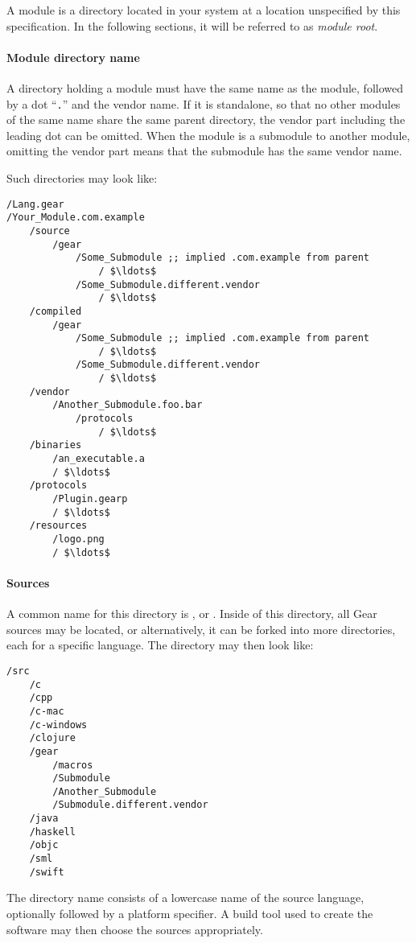 A module is a directory located in your system at a location unspecified by this specification. In the following sections, it will be referred to as {\em module root}. 

\paragraph{Module directory name}
A directory holding a module must have the same name as the module, followed by a dot ``\lstinline!.!'' and the vendor name. If it is standalone, so that no other modules of the same name share the same parent directory, the vendor part including the leading dot can be omitted. When the module is a submodule to another module, omitting the vendor part means that the submodule has the same vendor name. 

\example Such directories may look like:
\begin{lstlisting}
/Lang.gear
/Your_Module.com.example
    /source
        /gear
            /Some_Submodule ;; implied .com.example from parent
                / $\ldots$
            /Some_Submodule.different.vendor
                / $\ldots$
    /compiled
        /gear
            /Some_Submodule ;; implied .com.example from parent
                / $\ldots$
            /Some_Submodule.different.vendor
                / $\ldots$
    /vendor
        /Another_Submodule.foo.bar
            /protocols
                / $\ldots$
    /binaries
        /an_executable.a
        / $\ldots$
    /protocols
        /Plugin.gearp
        / $\ldots$
    /resources
        /logo.png
        / $\ldots$
\end{lstlisting} 

\paragraph{Sources}
A common name for this directory is , or . Inside of this directory, all Gear sources may be located, or alternatively, it can be forked into more directories, each for a specific language. The directory may then look like:
\begin{lstlisting}
/src
    /c
    /cpp
    /c-mac
    /c-windows
    /clojure
    /gear
        /macros
        /Submodule
        /Another_Submodule
        /Submodule.different.vendor
    /java
    /haskell
    /objc
    /sml
    /swift
\end{lstlisting}

The directory name consists of a lowercase name of the source language, optionally followed by a platform specifier. A build tool used to create the software may then choose the sources appropriately. 

